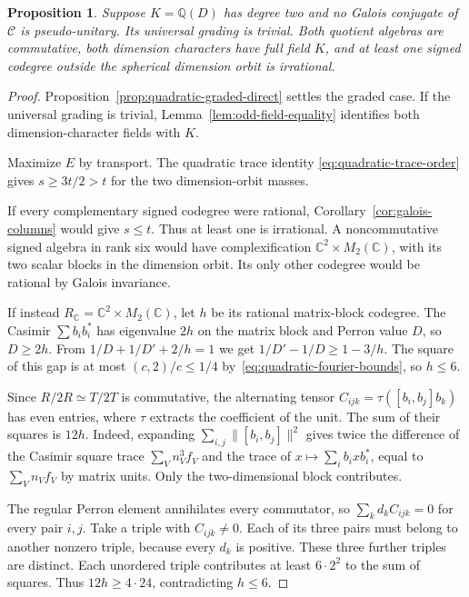 \documentclass[11pt,reqno]{amsart}
\newtheorem{proposition}[theorem]{Proposition}
\theoremstyle{remark}\newtheorem{remark}[theorem]{Remark}
\numberwithin{equation}{section}
\begin{document}
\begin{proposition}\label{prop:quadratic-full-character}
Suppose $K=\mathbb Q(D)$ has degree two and no Galois conjugate of $\mathcal C$ is pseudo-unitary. Its universal grading is trivial. Both quotient algebras are commutative, both dimension characters have full field $K$, and at least one signed codegree outside the spherical dimension orbit is irrational.
\end{proposition}
\begin{proof}
Proposition~\ref{prop:quadratic-graded-direct} settles the graded case. If the universal grading is trivial, Lemma~\ref{lem:odd-field-equality} identifies both dimension-character fields with $K$.

Maximize $E$ by transport. The quadratic trace identity
\eqref{eq:quadratic-trace-order} gives $s\ge3t/2>t$ for the two
dimension-orbit masses.

If every complementary signed codegree were rational,
Corollary~\ref{cor:galois-columns} would give $s\le t$. Thus at
least one is irrational. A noncommutative signed algebra in rank
six would have complexification $\mathbb C^2\times M_2(\mathbb C)$,
with its two scalar blocks in the dimension orbit. Its only other
codegree would be rational by Galois invariance.

If instead $R_{\mathbb C}=\mathbb C^2\times M_2(\mathbb C)$, let $h$
be its rational matrix-block codegree. The Casimir $\sum b_i b_i^*$
has eigenvalue $2h$ on the matrix block and Perron value $D$, so
$D\ge2h$. From $1/D+1/D'+2/h=1$ we get
$1/D'-1/D\ge1-3/h$. The square of this gap is at most
$(c,2)/c\le1/4$ by~\eqref{eq:quadratic-fourier-bounds}, so $h\le6$.

Since $R/2R\simeq T/2T$ is commutative, the alternating tensor
$C_{ijk}=\tau([b_i,b_j]b_k)$ has even entries, where $\tau$ extracts
the coefficient of the unit. The sum of their squares is $12h$.
Indeed, expanding $\sum_{i,j}\|[b_i,b_j]\|^2$ gives twice the
difference of the Casimir square trace $\sum_V n_V^3f_V$ and the
trace of $x\mapsto\sum_i b_ixb_i^*$, equal to $\sum_V n_Vf_V$
by matrix units. Only the two-dimensional block contributes.

The regular Perron element annihilates every commutator, so
$\sum_k d_k C_{ijk}=0$ for every pair $i,j$. Take a triple with
$C_{ijk}\ne0$. Each of its three pairs must belong to another
nonzero triple, because every $d_k$ is positive. These three further
triples are distinct. Each unordered triple contributes at least
$6\cdot2^2$ to the sum of squares. Thus $12h\ge4\cdot24$,
contradicting $h\le6$.
\end{proof}
\end{document}
